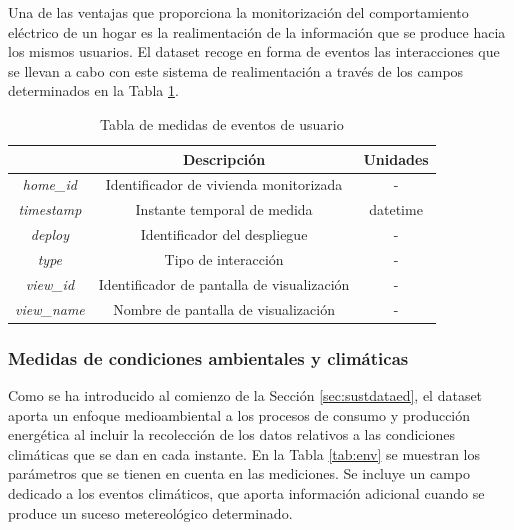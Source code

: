 Una de las ventajas que proporciona la monitorización del comportamiento eléctrico de un hogar es la realimentación de la información que se produce hacia los mismos usuarios. El dataset recoge en forma de eventos las interacciones que se llevan a cabo con este sistema de realimentación a través de los campos determinados en la Tabla \ref{tab:users}. 

\vspace{3mm}

\begin{table}[h!]
    \centering
    \begin{tabular}{|c|c|c|}
    \hline
    \rowcolor[HTML]{AAAAAA} 
    \multicolumn{1}{|c|}{\cellcolor[HTML]{AAAAAA}Campo} & \multicolumn{1}{c|}{\cellcolor[HTML]{AAAAAA}Descripción} & Unidades \\ \hline
    \textit{home\_id} & Identificador de vivienda monitorizada & - \\ \hline
    \textit{timestamp} & Instante temporal de medida & datetime \\ \hline
    \textit{deploy} & Identificador del despliegue & - \\ \hline
    \textit{type} & Tipo de interacción & - \\ \hline
    \textit{view\_id} & Identificador de pantalla de visualización & - \\ \hline
    \textit{view\_name} & Nombre de pantalla de visualización & - \\ \hline
    \end{tabular}
    \caption{Tabla de medidas de eventos de usuario \cite{sustdata}}
    \label{tab:users}
\end{table}

\subsubsection{Medidas de condiciones ambientales y climáticas}

Como se ha introducido al comienzo de la Sección \ref{sec:sustdataed}, el dataset aporta un enfoque medioambiental a los procesos de consumo y producción energética al incluir la recolección de los datos relativos a las condiciones climáticas que se dan en cada instante. En la Tabla \ref{tab:env} se muestran los parámetros que se tienen en cuenta en las mediciones. Se incluye un campo dedicado a los eventos climáticos, que aporta información adicional cuando se produce un suceso metereológico determinado.

\vspace{3mm}

